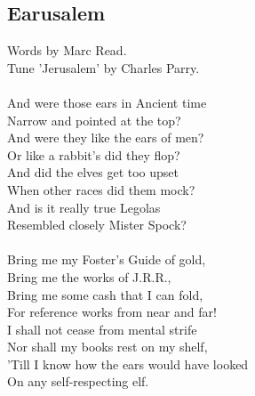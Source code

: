 \begin{multicols}{2}
\section{Earusalem}
Words by Marc Read.
\\
Tune ’Jerusalem’ by Charles Parry.
\\
\\
And were those ears in Ancient time
\\
Narrow and pointed at the top?
\\
And were they like the ears of men?
\\
Or like a rabbit’s did they flop?
\\
And did the elves get too upset
\\
When other races did them mock?
\\
And is it really true Legolas
\\
Resembled closely Mister Spock?
\\
\\
Bring me my Foster’s Guide of gold,
\\
Bring me the works of J.R.R.,
\\
Bring me some cash that I can fold,
\\
For reference works from near and far!
\\
I shall not cease from mental strife
\\
Nor shall my books rest on my shelf,
\\
’Till I know how the ears would have looked
\\
On any self-respecting elf.
\\
\\
\\
\end{multicols}
